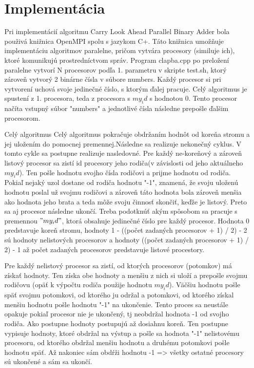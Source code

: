 \documentclass[11pt,a4paper,titlepage,final]{article}
\begin{document}
\section{Implementácia}
Pri implementácií algoritmu Carry Look Ahead Parallel Binary Adder bola použivá knižnica OpenMPI spolu s jazykom C+. Táto knižnica umožňuje implementáciu algoritmov paralelne, pričom vytvára procesory (similuje ich), ktoré komunikujú prostredníctvom správ. Program clapba.cpp po preložení paralelne vytvorí N procesorov podľa 1. parametru v skripte test.sh, ktorý zároveň vytvorý 2 binárne čísla  v súbore numbers. Každý procesor si pri vytvorení uchová svoje jedinečné číslo, s ktorým ďalej pracuje. Celý algoritmus je spustení z 1. procesora, teda z procesora s $my_id$ s hodnotou 0. Tento procesor načíta vstupný súbor "numbers" a jednotlivé čísla následne prepošle ďalšim procesorom. 

Celý algoritmus 
Celý algoritmus pokračuje obdržaním hodnôt od koreňa stromu a jej uložením do pomocnej premennej.Následne sa realizuje nekonečný cyklus. V tomto cykle sa postupne realizuje nasledovné. Pre každý ne-koreňový a zároveň listový procesor sa zistí id procesory jeho rodiča(v závislosti od jeho aktuálneho $my_id$). Ten pošle hodnotu svojho čísla rodičovi a prijme hodnotu od rodiča. Pokiaľ nejaký uzol dostane od rodiča hodnotu "-1", znamená,  že svoju uloženú hodnotu poslal už svojmu rodičovi a zároveň táto hodnota bola zároveň menšia ako hodnota jeho brata a teda môže svoju činnosť skončiť, keďže je listový. Preto sa aj procesor následne ukončí. Treba podotknúť akým spôsobom sa pracuje s premennou $"my_id"$, ktorá obsahuje jedinečné číslo pre každý procesor. Hodnota 0 predstavuje koreň stromu, hodnoty 1 - ((počet zadaných procesorov + 1) / 2) - 2 sú hodnoty nelistových procesorov a hodnoty ((počet zadaných procesorov + 1) / 2) - 1 až počet zadaných procesorov predstavuje listové procestory.

Pre každý nelistový procesor sa zistí, od ktorých procesorov (potomkov) má získať hodnoty. Ten získa obe hodnoty a menšiu z nich si uloží a prepošle svojmu rodičovu (opäť k výpočtu rodiča použije hodnotu $my_id$). Väčšiu hodnotu pošle späť svojmu potomkovi, od ktorého ju održal a potomkovi, od ktorého získal menšiu hodnotu pošle hodnotu "-1" na ukončenie.  Tento proces sa neustále opakuje pokiaľ procesor nie je ukončený, tj neobdržal hodnota -1 od svojho rodiča. Ako postupne hodnoty postupujú až dosiahnu koreň. Ten postupne vypisuje hodnoty, ktoré obdržal na výstup a pošle sa hodnota "-1" nelistovému procesoru, od ktorého obdržal menšiu hodnotu a druhému potomkovi pošle hodnotu späť. Až nakoniec sám obdŕži hodnotu -1 => všetky ostatné procesory sú ukončené a sám sa ukončí.
\end{document}
